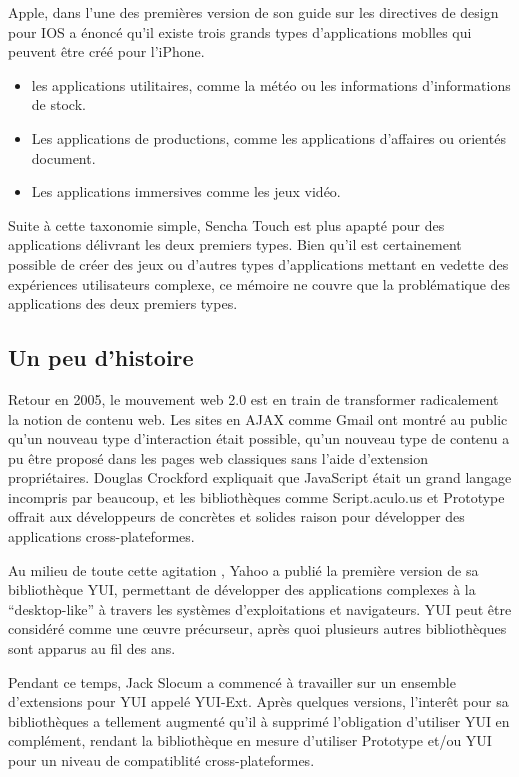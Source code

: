 Apple, dans l’une des premières version de son guide sur les directives de design pour IOS a énoncé qu’il existe trois grands types d’applications moblles qui peuvent être créé pour l’iPhone.


\begin{itemize}

  \item[\textbullet]
  les applications utilitaires, comme la météo ou les informations d’informations de stock.

  \item[\textbullet]
  Les applications de productions, comme les applications d’affaires ou orientés document.

  \item[\textbullet]
  Les applications immersives comme les jeux vidéo.

\end{itemize}

Suite à cette taxonomie simple, Sencha Touch est plus apapté pour des applications délivrant les deux premiers types. Bien qu’il est certainement possible de créer des jeux ou d’autres types d’applications mettant en vedette des expériences utilisateurs complexe, ce mémoire ne couvre que la problématique des applications des deux premiers types.

\subsection{Un peu d’histoire}

Retour en 2005, le mouvement web 2.0 est en train de transformer radicalement la notion de contenu web. Les sites en AJAX comme Gmail ont montré au public qu’un nouveau type d’interaction était possible, qu’un nouveau type de contenu a pu être proposé dans les pages web classiques sans l’aide d'extension propriétaires. Douglas Crockford expliquait que JavaScript était un grand langage incompris par beaucoup, et les bibliothèques comme Script.aculo.us et Prototype offrait aux développeurs de concrètes et solides raison pour développer des applications cross-plateformes.

Au milieu de toute cette agitation , Yahoo a publié la première version de sa bibliothèque YUI, permettant de développer des applications complexes à la “desktop-like” à travers les systèmes d’exploitations et navigateurs. YUI peut être considéré comme une œuvre précurseur, après quoi plusieurs autres bibliothèques sont apparus au fil des ans.

Pendant ce temps, Jack Slocum a commencé à travailler sur un ensemble d’extensions pour YUI appelé YUI-Ext. Après quelques versions, l’interêt pour sa bibliothèques a tellement augmenté qu’il à supprimé l’obligation d’utiliser YUI en complément, rendant la bibliothèque en mesure d’utiliser Prototype et/ou YUI pour un niveau de compatiblité cross-plateformes.

